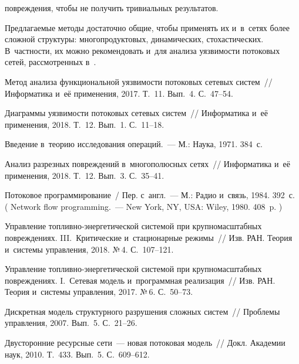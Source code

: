 \begin{multicols}{2}
\pagebreak

\noindent
 повреждения, чтобы не получить тривиальных результатов.

Предлагаемые методы достаточно общие, чтобы применять их и~в~сетях более 
сложной структуры: многопродуктовых, динамических, стохастических. 
В~частности, их можно рекомендовать и~для анализа уязвимости потоковых сетей, 
рассмотренных в~\cite{Kuz}. 

\vspace*{-6pt}

{\small\frenchspacing
 {%
 \begin{thebibliography}{9}
    
Метод анализа функциональной уязвимости потоковых сетевых систем~// 
Информатика и~её применения, 2017. Т.~11. Вып.~4. С.~47--54.

Диаграммы уязвимости потоковых сетевых систем~// Информатика и~её применения, 2018. 
Т.~12. Вып.~1. С.~11--18.

 Введение в~теорию исследования операций.~--- 
М.: Наука, 1971. 384~с.

Анализ разрезных повреждений в~многополюсных сетях~// Информатика и~её 
применения, 2018. Т.~12. Вып.~3. С.~35--41.

 Потоковое программирование~/ Пер. с~англ.~--- 
М.: Радио и~связь, 1984. 392~с. ( 
Network flow programming.~--- New York, NY, USA: Wiley, 1980. 408~p. )

Управ\-ле\-ние топ\-лив\-но-энер\-ге\-ти\-че\-ской сис\-те\-мой при крупномасштабных повреждениях.
III.~Критические и~стационарные режимы~// 
Изв. РАН. Тео\-рия и~сис\-те\-мы управ\-ле\-ния, 2018. 
№\,4. С.~107--121.



Управ\-ле\-ние   топ\-лив\-но-энер\-ге\-ти\-че\-ской  сис\-те\-мой  
при  крупномасштабных повреждениях. I.~Сетевая  модель  и~программная реализация~// 
Изв. РАН. Теория и~сис\-те\-мы управления,  2017. №\,6. С.~50--73.

 Дискретная модель структурного разрушения сложных сис\-тем~// Проб\-ле\-мы 
 управ\-ле\-ния, 2007. Вып.~5. С.~21--26.

Двусторонние ресурсные сети~--- новая потоковая модель~// Докл. Академии наук, 2010. 
Т.~433. Вып.~5. С.~609--612.
 \end{thebibliography}

 }
 }

\end{multicols}

